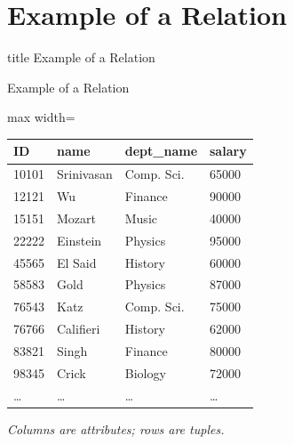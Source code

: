 \documentclass[aspectratio=169, xcolor=dvipsnames]{beamer}
\begin{document}
\section{Example of a Relation}

\begin{frame}
  \vfill
  \centering
  \begin{beamercolorbox}[sep=8pt,center,shadow=true,rounded=true]{title}
    Example of a Relation\par%
  \end{beamercolorbox}
  \vfill
\end{frame}

\begin{frame}{Example of a Relation}
    \begin{center}
        \begin{adjustbox}{max width=\textwidth}
        \begin{tabular}{|l|l|l|l|}
        \hline
        \textbf{ID} & \textbf{name} & \textbf{dept\_name} & \textbf{salary} \\ \hline
        10101 & Srinivasan & Comp. Sci. & 65000 \\ \hline
        12121 & Wu         & Finance    & 90000 \\ \hline
        15151 & Mozart     & Music      & 40000 \\ \hline
        22222 & Einstein   & Physics    & 95000 \\ \hline
        45565 & El Said    & History    & 60000 \\ \hline
        58583 & Gold       & Physics    & 87000 \\ \hline
        76543 & Katz       & Comp. Sci. & 75000 \\ \hline
        76766 & Califieri  & History    & 62000 \\ \hline
        83821 & Singh      & Finance    & 80000 \\ \hline
        98345 & Crick      & Biology    & 72000 \\ \hline
        \dots & \dots      & \dots      & \dots \\ \hline
        \end{tabular}
        \end{adjustbox}
        
        \vspace{1em}
        \textit{Columns are attributes; rows are tuples.}
    \end{center}
\end{frame}
\end{document}

